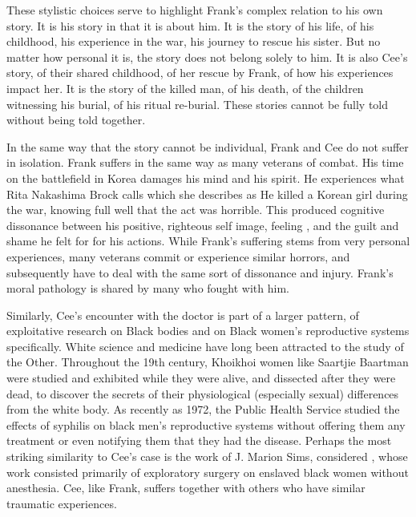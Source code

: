 \documentclass[12pt]{article}
\begin{document}
These stylistic choices serve to highlight Frank's complex relation to his own
story. It is his story in that it is about him. It is the story of his life, of
his childhood, his experience in the war, his journey to rescue his sister. But
no matter how personal it is, the story does not belong solely to him. It is
also Cee's story, of their shared childhood, of her rescue by Frank, of how his
experiences impact her. It is the story of the killed man, of his death, of the
children witnessing his burial, of his ritual re-burial. These stories cannot
be fully told without being told together.

In the same way that the story cannot be individual, Frank and Cee do not
suffer in isolation. Frank suffers in the same way as many veterans of combat.
His time on the battlefield in Korea damages his mind and his spirit. He
experiences what Rita Nakashima Brock calls  which she
describes as \autocite{Brock15} He
killed a Korean girl during the war, knowing full well that the act was
horrible. This produced cognitive dissonance between his positive, righteous
self image, feeling ,\autocite[p. 133]{Morrison12} and the guilt and shame he felt for for
his actions. While Frank's suffering stems from very personal experiences, many
veterans commit or experience similar horrors, and subsequently have to deal
with the same sort of dissonance and injury. Frank's moral pathology is shared
by many who fought with him.

Similarly, Cee's encounter with the doctor is part of a larger pattern, of
exploitative research on Black bodies and on Black women's reproductive systems
specifically. White science and medicine have long been attracted to the study
of the Other. Throughout the 19th century, Khoikhoi women like Saartjie
Baartman were studied and exhibited while they were alive, and dissected after
they were dead, to discover the secrets of their physiological (especially
sexual) differences from the white body.\autocite{Qureshi04} As recently as
1972, the Public Health Service studied the effects of syphilis on black men's
reproductive systems without offering them any treatment or even notifying them
that they had the disease. Perhaps the most striking similarity to Cee's case
is the work of J. Marion Sims, considered , whose work consisted primarily of exploratory surgery on enslaved
black women without anesthesia.\autocite{Spettel11} Cee, like Frank, suffers
together with others who have similar traumatic experiences.
\end{document}
